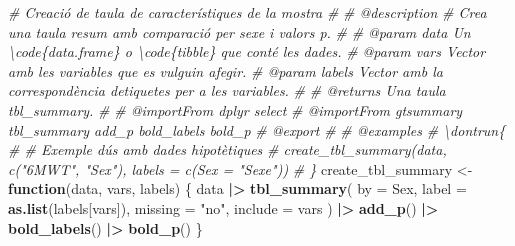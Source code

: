 \documentclass[CAT]{TFUOC}%
\newenvironment{Shaded}{\begin{snugshade}}{\end{snugshade}}
\newcommand{\AttributeTok}[1]{\textcolor[rgb]{0.13,0.29,0.53}{#1}}
\newcommand{\CommentTok}[1]{\textcolor[rgb]{0.56,0.35,0.01}{\textit{#1}}}
\newcommand{\ControlFlowTok}[1]{\textcolor[rgb]{0.13,0.29,0.53}{\textbf{#1}}}
\newcommand{\FunctionTok}[1]{\textcolor[rgb]{0.13,0.29,0.53}{\textbf{#1}}}
\newcommand{\NormalTok}[1]{#1}
\newcommand{\OtherTok}[1]{\textcolor[rgb]{0.56,0.35,0.01}{#1}}
\newcommand{\SpecialCharTok}[1]{\textcolor[rgb]{0.81,0.36,0.00}{\textbf{#1}}}
\newcommand{\StringTok}[1]{\textcolor[rgb]{0.31,0.60,0.02}{#1}}
\begin{document}
\begin{Shaded}
\begin{Highlighting}[]
\CommentTok{\#\textquotesingle{} Creació de taula de característiques de la mostra}
\CommentTok{\#\textquotesingle{} }
\CommentTok{\#\textquotesingle{} @description}
\CommentTok{\#\textquotesingle{} Crea una taula resum amb comparació per sexe i valors p.}
\CommentTok{\#\textquotesingle{} }
\CommentTok{\#\textquotesingle{} @param data Un \textbackslash{}code\{data.frame\} o \textbackslash{}code\{tibble\} que conté les dades.}
\CommentTok{\#\textquotesingle{} @param vars Vector amb les variables que es vulguin afegir.}
\CommentTok{\#\textquotesingle{} @param labels Vector amb la correspondència d\textquotesingle{}etiquetes per a les variables.}
\CommentTok{\#\textquotesingle{}}
\CommentTok{\#\textquotesingle{} @returns Una taula tbl\_summary.}
\CommentTok{\#\textquotesingle{} }
\CommentTok{\#\textquotesingle{} @importFrom dplyr select}
\CommentTok{\#\textquotesingle{} @importFrom gtsummary tbl\_summary add\_p bold\_labels bold\_p}
\CommentTok{\#\textquotesingle{} @export}
\CommentTok{\#\textquotesingle{}}
\CommentTok{\#\textquotesingle{} @examples}
\CommentTok{\#\textquotesingle{} \textbackslash{}dontrun\{}
\CommentTok{\#\textquotesingle{} \# Exemple d\textquotesingle{}ús amb dades hipotètiques}
\CommentTok{\#\textquotesingle{} create\_tbl\_summary(data, c("6MWT", "Sex"), labels = c(Sex = "Sexe"))}
\CommentTok{\#\textquotesingle{} \}}
\NormalTok{create\_tbl\_summary }\OtherTok{\textless{}{-}} \ControlFlowTok{function}\NormalTok{(data, vars, labels) \{}
\NormalTok{  data }\SpecialCharTok{|\textgreater{}}
    \FunctionTok{tbl\_summary}\NormalTok{(}
      \AttributeTok{by =}\NormalTok{ Sex, }
      \AttributeTok{label =} \FunctionTok{as.list}\NormalTok{(labels[vars]), }
      \AttributeTok{missing =} \StringTok{"no"}\NormalTok{, }
      \AttributeTok{include =}\NormalTok{ vars}
\NormalTok{    ) }\SpecialCharTok{|\textgreater{}} 
    \FunctionTok{add\_p}\NormalTok{() }\SpecialCharTok{|\textgreater{}} 
    \FunctionTok{bold\_labels}\NormalTok{() }\SpecialCharTok{|\textgreater{}}
    \FunctionTok{bold\_p}\NormalTok{()}
\NormalTok{\}}



\end{Highlighting}
\end{Shaded}
\end{document}
